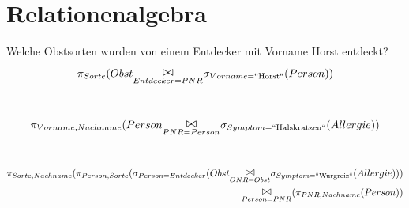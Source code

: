 \documentclass[ngerman]{gdb-aufgabenblatt}
\begin{document}
\section{Relationenalgebra}

\begin{compactenum}[(a)]
	\item Welche Obstsorten wurden von einem Entdecker mit Vorname Horst entdeckt? 
	\begin{align*}
	 &\projektion{Sorte}(Obst\verbund{Entdecker=PNR} \selektion{Vorname=\wert{Horst}}(Person))
	\\  
\end{align*}\
	\item 
	\begin{align*}
 	&\projektion{Vorname,Nachname}(Person\verbund{PNR=Person} \selektion{Symptom=\wert{Halskratzen}}(Allergie))
	\\  
\end{align*}\
	\item 
	\begin{align*}
 	\projektion{Sorte,Nachname}(\projektion{Person,Sorte}(\selektion{Person=Entdecker}(Obst\verbund{ONR=Obst} \selektion{Symptom=\wert{Wurgreiz}}(Allergie)))\\
 	\verbund{Person=PNR}(\projektion{PNR,Nachname}(Person))
	\\  
\end{align*}\
\end{compactenum}
\end{document}

